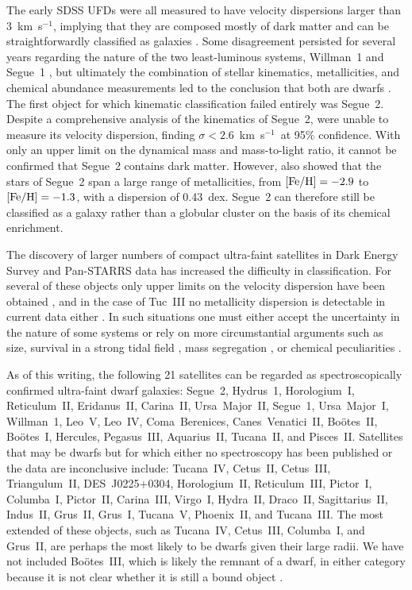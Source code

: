 \documentclass[a4paper]{ar-1col}
\newcommand{\kms}         {km~s$^{-1}$}
\newcommand{\feh}         {[Fe/H]}
\begin{document}
The early SDSS UFDs were all measured to have velocity dispersions
larger than 3~\kms, implying that they are composed mostly of dark
matter and can be straightforwardly classified as galaxies
\citep{kleyna05,munoz06,martin07,sg07,geha09}.  Some disagreement
persisted for several years regarding the nature of the two
least-luminous systems, Willman~1 and Segue~1
\citep[e.g.,][]{belokurov07,siegel08,no09}, but ultimately the
combination of stellar kinematics, metallicities, and chemical
abundance measurements led to the conclusion that both are dwarfs
\citep{willman11,simon11,fsk14}.  The first object for which kinematic
classification failed entirely was Segue~2.  Despite a comprehensive
analysis of the kinematics of Segue~2, \citet{kirby13} were unable to
measure its velocity dispersion, finding $\sigma < 2.6$~\kms\ at 95\%
confidence.  With only an upper limit on the dynamical mass and
mass-to-light ratio, it cannot be confirmed that Segue~2 contains dark
matter.  However, \citeauthor{kirby13} also showed that the stars of
Segue~2 span a large range of metallicities, from ${\rm \feh} = -2.9$
to ${\rm \feh} = -1.3$, with a dispersion of 0.43~dex.  Segue~2 can
therefore still be classified as a galaxy rather than a globular
cluster on the basis of its chemical enrichment.

The discovery of larger numbers of compact ultra-faint satellites in
Dark Energy Survey and Pan-STARRS data
\citep{bechtol15,koposov15,drlica15,laevens15,laevens15b} has
increased the difficulty in classification.  For several of these
objects only upper limits on the velocity dispersion have been
obtained \citep{kirby15,kirby17,martin16b,simon17}, and in the case of
Tuc~III no metallicity dispersion is detectable in current data either
\citep{simon17}.  In such situations one must either accept the
uncertainty in the nature of some systems or rely on more
circumstantial arguments such as size, survival in a strong tidal
field \citep[e.g.,][]{simon17}, mass segregation \citep{kim15kim2}, or
chemical peculiarities .

As of this writing, the following 21 satellites can be regarded as
spectroscopically confirmed ultra-faint dwarf galaxies: Segue~2,
Hydrus~1, Horologium~I, Reticulum~II, Eridanus~II, Carina~II,
Ursa~Major~II, Segue~1, Ursa~Major~I, Willman~1, Leo~V, Leo~IV,
Coma~Berenices, Canes~Venatici~II, Bo{\"o}tes~II, Bo{\"o}tes~I,
Hercules, Pegasus~III, Aquarius~II, Tucana~II, and Pisces~II.
Satellites that may be dwarfs but for which either no spectroscopy has
been published or the data are inconclusive include: Tucana~IV,
Cetus~II, Cetus~III, Triangulum~II, DES~J0225+0304, Horologium~II,
Reticulum~III, Pictor~I, Columba~I, Pictor~II, Carina~III, Virgo~I,
Hydra~II, Draco~II, Sagittarius~II, Indus~II, Grus~II, Grus~I,
Tucana~V, Phoenix~II, and Tucana~III.  The most extended of these
objects, such as Tucana~IV, Cetus~III, Columba~I, and Grus~II, are
perhaps the most likely to be dwarfs given their large radii.  We have
not included Bo{\"o}tes~III, which is likely the remnant of a dwarf,
in either category because it is not clear whether it is still a bound
object \citep{grillmair09,carlin09,cs18}.
\end{document}
